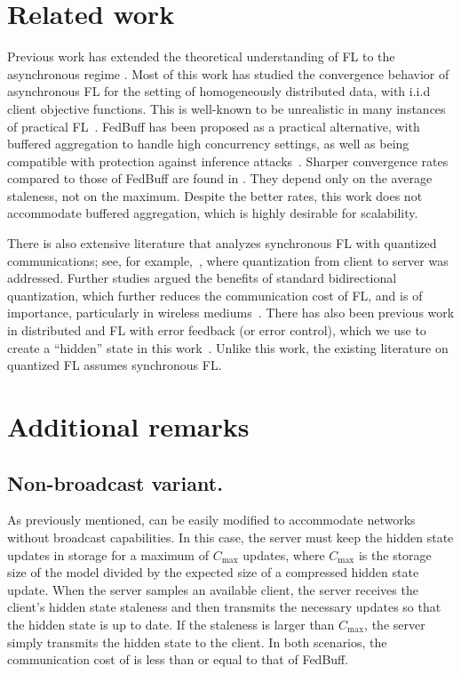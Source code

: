 \section{Related work}
\label{appsec:related-work}
Previous work has extended the theoretical understanding of FL to the asynchronous regime \cite{asyncfl, hogwild, improved_async, critical_params, perturbedIterate}.
Most of this work has studied the convergence behavior of asynchronous FL for the setting of homogeneously distributed data, with i.i.d client objective functions.
This is well-known to be unrealistic in many instances of practical FL~\cite{advances_open_problems}.
FedBuff has been proposed as a practical alternative, with buffered aggregation to handle high concurrency settings, as well as being compatible with protection against inference attacks~\cite{FedBuff}.
Sharper convergence rates compared to those of FedBuff are found in \cite{sharper_async}.
They depend only on the average staleness, not on the maximum.
Despite the better rates, this work does not accommodate buffered aggregation, which is highly desirable for scalability.

There is also extensive literature that analyzes synchronous FL with quantized communications; see, for example,~\cite{communication_efficient}, where quantization from client to server was addressed.
Further studies argued the benefits of standard bidirectional quantization, which further reduces the communication cost of FL, and is of importance, particularly in wireless mediums~\cite{quantized_global_model}.
There has also been previous work in distributed and FL with error feedback (or error control), which we use to create a ``hidden'' state in this work~\cite{new_simpler_ef, EF21-P-and-friends, gossiped_OMKL, choco_sgd}.
Unlike this work, the existing literature on quantized FL assumes synchronous FL.

\section{Additional remarks}
\label{appsec:additional-remarks}
\subsection{Non-broadcast variant.} \label{appsec:non-broadcast}
As previously mentioned, \algname can be easily modified to accommodate networks without broadcast capabilities.
In this case, the server must keep the hidden state updates in storage for a maximum of $C_{\max}$ updates, where $C_{\max}$ is the storage size of the model divided by the expected size of a compressed hidden state update.
When the server samples an available client, the server receives the client's hidden state staleness and then transmits the necessary updates so that the hidden state is up to date.
If the staleness is larger than $C_{\max}$, the server simply transmits the hidden state to the client.
In both scenarios, the communication cost of \algname is less than or equal to that of FedBuff.

